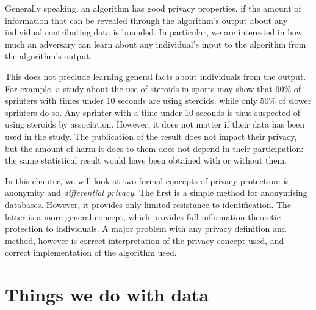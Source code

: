 {  Generally speaking, an algorithm has good privacy properties, if the
  amount of information that can be revealed through the algorithm's
  output about any individual contributing data is bounded. In
  particular, we are interested in how much an adversary can learn
  about any individual's input to the algorithm from the algorithm's
  output.

  This does not preclude learning general facts about individuals from
  the output. For example, a study about the use of steroids in sports
  may show that 90\% of sprinters with times under 10 seconds are
  using steroids, while only 50\% of slower sprinters do so. Any
  sprinter with a time under 10 seconds is thus suspected of using
  steroids by association. However, it does not matter if their data
  has been used in the study. The publication of the result does not
  impact their privacy, but the amount of harm it does to them does
  not depend in their participation: the same statistical result would
  have been obtained with or without them.
  
  In this chapter, we will look at two formal concepts of privacy
  protection: $k$-anonymity and \emph{differential privacy}. The first
  is a simple method for anonymising databases. However, it provides
  only limited resistance to identification. The latter is a more
  general concept, which provides full information-theoretic
  protection to individuals. A major problem with any privacy
  definition and method, however is correct interpretation of the
  privacy concept used, and correct implementation of the algorithm
  used.
}



\section{Things we do with data}

 


